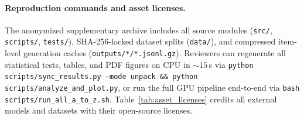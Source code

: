 \documentclass{article}
\begin{document}
\begin{table}[h]
\centering
\caption{End-to-end per-query wall-clock latency (mean / P95 in seconds) and cumulative single-GPU runtime (minutes across $N=450$ prompts) on NVIDIA L40 GPUs (\texttt{bfloat16}, $\text{seed}=42$).}
\label{tab:latency_compute}
\end{table}

\paragraph{Reproduction commands and asset licenses.}
The anonymized supplementary archive includes all source modules (\texttt{src/}, \texttt{scripts/}, \texttt{tests/}), SHA-256-locked dataset splits (\texttt{data/}), and compressed item-level generation caches (\texttt{outputs/*/*.jsonl.gz}). Reviewers can regenerate all statistical tests, tables, and PDF figures on CPU in $\sim 15$\,s via \texttt{python scripts/sync\_results.py --mode unpack \&\& python scripts/analyze\_and\_plot.py}, or run the full GPU pipeline end-to-end via \texttt{bash scripts/run\_all\_a\_to\_z.sh}. Table~\ref{tab:asset_licenses} credits all external models and datasets with their open-source licenses.
\end{document}
